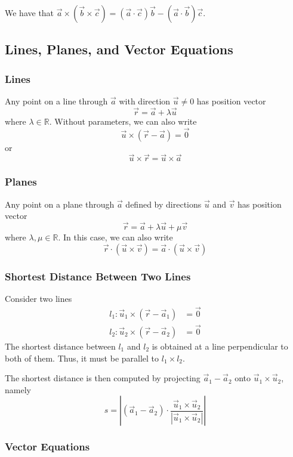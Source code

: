 \documentclass[12pt]{article}
\begin{document}
We have that 
$\vec{a} \times (\vec{b} \times \vec{c}) = 
(\vec{a} \cdot \vec{c})\vec{b} - (\vec{a} \cdot \vec{b})\vec{c}$.

\subsection{Lines, Planes, and Vector Equations}

\subsubsection{Lines}

Any point on a line through $\vec{a}$ with direction $\vec{u} \ne 0$ has position vector
\[
    \vec{r} = \vec{a} + \lambda \vec{u}
\]
where $\lambda \in \mathbb{R}$.
Without parameters, we can also write
\[
\vec{u} \times (\vec{r} - \vec{a}) = \vec{0}
\]
or
\[
\vec{u} \times \vec{r} = \vec{u} \times \vec{a}
\]

\subsubsection{Planes}

Any point on a plane through $\vec{a}$
defined by directions $\vec{u}$ and $\vec{v}$ has position vector
\[
\vec{r} = \vec{a} + \lambda \vec{u} + \mu \vec{v}
\]
where $\lambda ,\mu \in \mathbb{R}$. In this case, we can also write
\[
\vec{r} \cdot (\vec{u} \times \vec{v}) = \vec{a} \cdot (\vec{u} \times \vec{v})
\]

\subsubsection*{Shortest Distance Between Two Lines}
Consider two lines
\begin{align*}
    l_{1} : \vec{u}_1 \times (\vec{r} - \vec{a}_1) &= \vec{0}\\
    l_{2} : \vec{u}_2 \times (\vec{r} - \vec{a}_2) &= \vec{0}
\end{align*}
The shortest distance between $l_{1}$ and $l_{2}$ is
obtained at a line perpendicular to both of them.
Thus, it must be parallel to $l_{1} \times l_{2}$.

The shortest distance is then computed by projecting
$\vec{a}_1 - \vec{a}_2$ onto $\vec{u}_1 \times \vec{u}_2$, namely
\[
s = \left|(\vec{a}_1 - \vec{a}_2) \cdot \frac{\vec{u}_1 \times \vec{u}_2}{|\vec{u}_1 \times \vec{u}_2|}\right|
\]
\subsubsection{Vector Equations}
\end{document}
